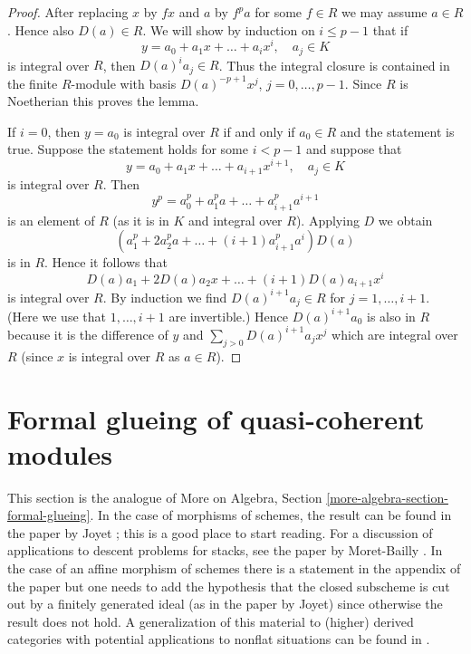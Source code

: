 \begin{proof}
After replacing $x$ by $fx$ and $a$ by $f^pa$ for some $f \in R$
we may assume $a \in R$. Hence also $D(a) \in R$. We will show
by induction on $i \leq p - 1$ that if
$$
y = a_0 + a_1x + \ldots + a_i x^i,\quad a_j \in K
$$
is integral over $R$, then $D(a)^i a_j \in R$. Thus the integral
closure is contained in the finite $R$-module with basis
$D(a)^{-p + 1}x^j$, $j = 0, \ldots, p - 1$. Since $R$ is Noetherian
this proves the lemma.

\medskip\noindent
If $i = 0$, then $y = a_0$ is integral over $R$ if and only if $a_0 \in R$
and the statement is true. Suppose the statement holds for some $i < p - 1$
and suppose that
$$
y = a_0 + a_1x + \ldots + a_{i + 1} x^{i + 1},\quad a_j \in K
$$
is integral over $R$. Then
$$
y^p = a_0^p + a_1^p a + \ldots + a_{i + 1}^pa^{i + 1}
$$
is an element of $R$ (as it is in $K$ and integral over $R$). Applying
$D$ we obtain
$$
(a_1^p + 2a_2^p a + \ldots + (i + 1)a_{i + 1}^p a^i)D(a)
$$
is in $R$. Hence it follows that
$$
D(a)a_1 + 2D(a) a_2 x + \ldots + (i + 1)D(a) a_{i + 1} x^i
$$
is integral over $R$. By induction we find $D(a)^{i + 1}a_j \in R$
for $j = 1, \ldots, i + 1$. (Here we use that $1, \ldots, i + 1$
are invertible.) Hence $D(a)^{i + 1}a_0$ is also in $R$ because it
is the difference of $y$ and $\sum_{j > 0} D(a)^{i + 1}a_jx^j$ which
are integral over $R$ (since $x$ is integral over $R$ as $a \in R$).
\end{proof}






\section{Formal glueing of quasi-coherent modules}
\label{section-formal-glueing}

\noindent
This section is the analogue of
More on Algebra, Section \ref{more-algebra-section-formal-glueing}.
In the case of morphisms of schemes, the result can be found in
the paper by Joyet \cite{Joyet}; this is a good place to start reading.
For a discussion of applications to descent problems for stacks, see the
paper by Moret-Bailly \cite{MB}. In the case of an affine
morphism of schemes there is a statement in the appendix of the paper
\cite{Ferrand-Raynaud} but one needs to add the hypothesis
that the closed subscheme is cut out by a finitely generated
ideal (as in the paper by Joyet) since otherwise the result does not hold.
A generalization of this material to (higher) derived categories
with potential applications to nonflat situations
can be found in \cite[Section 5]{Bhatt-Algebraize}.

